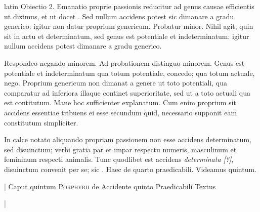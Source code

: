 \begin{otherlanguage*}{latin}
\pstart
Obiectio 2. Emanatio proprie passionis reducitur ad genus causae efficientis ut diximus, et ut docet . Sed nullum accidens potest sic dimanare a gradu generico:
igitur non datur proprium genericum. Probatur minor. Nihil agit, quin sit in actu et determinatum, sed genus est potentiale et indeterminatum:
igitur nullum accidens potest dimanare a gradu generico. 
\pend

\pstart
Respondeo negando minorem. Ad probationem distinguo minorem. Genus est potentiale et indeterminatum qua totum potentiale, concedo; qua totum actuale, nego. Proprium genericum non dimanat a genere ut toto potentiali, qua comparatur ad inferiora illaque continet superioritate, sed ut a toto actuali qua est contitutum. Mane hoc sufficienter explanatum. Cum enim proprium sit accidens essentiae tribuens ei esse secundum quid, necessario supponit eam constitutum simpliciter. 
\pend

\pstart
In calce notato aliquando propriam passionem non esse accidens determinatum, sed disuinctum; verbi gratia par et impar respectu numeris, masculinum et femininum respecti animalis. Tunc quodlibet est accidens \emph{determinata [?]}, disuinctum convenit per se; sic . Haec de quarto praedicabili. Videamus quintum. 
\pend

\pstart
{}
\pend

\pstart
{}
\pend

\pstart
\noindent%
\textnormal{|} Caput quintum \textsc{Porphyrii} de Accidente quinto Praedicabili Textus 
\pend

\pstart
\textnormal{|}  
\pend


\end{otherlanguage*}
